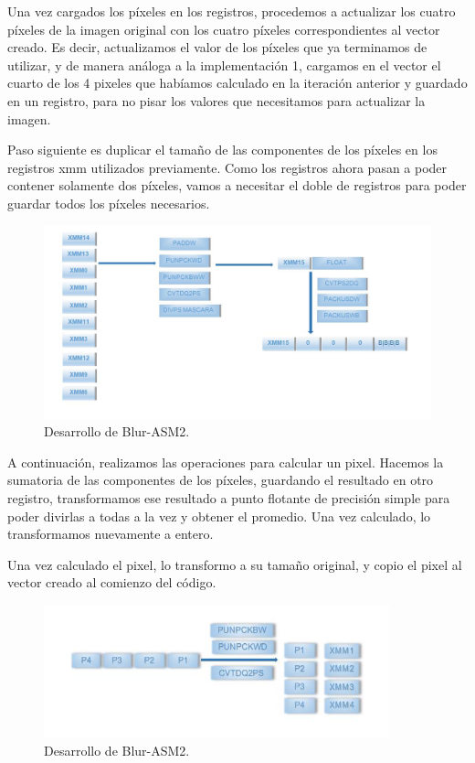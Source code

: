 Una vez cargados los píxeles en los registros, procedemos a actualizar los cuatro píxeles de la imagen original con los cuatro píxeles correspondientes al vector creado. Es decir, actualizamos el valor de los píxeles que ya terminamos de utilizar, y de manera análoga a la implementación 1, cargamos en el vector el cuarto de los 4 pixeles que habíamos calculado en la iteración anterior y guardado en un registro, para no pisar los valores que necesitamos para actualizar la imagen.

Paso siguiente es duplicar el tamaño de las componentes de los píxeles en los registros xmm utilizados previamente. Como los registros ahora pasan a poder contener solamente dos píxeles, vamos a necesitar el doble de registros para poder guardar todos los píxeles necesarios.

\begin{figure}[ht!]
\centering
\includegraphics[width=120mm]{imagenes/blur/blur2-3.png}
\caption{Desarrollo de Blur-ASM2.}
\end{figure}

A continuación, realizamos las operaciones para calcular un pixel. Hacemos la sumatoria de las componentes de los píxeles, guardando el resultado en otro registro, transformamos ese resultado a punto flotante de precisión simple para poder divirlas a todas a la vez y obtener el promedio. Una vez calculado, lo transformamos nuevamente a entero.

Una vez calculado el pixel, lo transformo a su tamaño original, y copio el pixel al vector creado al comienzo del código. 

\begin{figure}[ht!]
\centering
\includegraphics[width=100mm]{imagenes/blur/blur2-4.png}
\caption{Desarrollo de Blur-ASM2.}
\end{figure}

